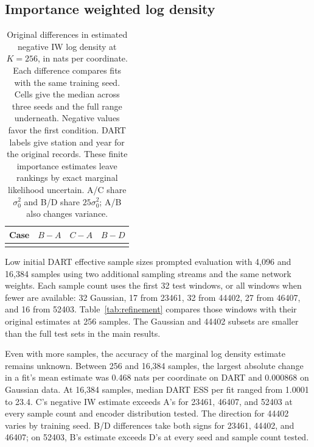 \documentclass{article}
\begin{document}
\subsection{Importance weighted log density}
\begin{table}[H]
\centering
\caption{Original differences in estimated negative IW log density at $K=256$, in nats per coordinate. Each difference compares fits with the same training seed. Cells give the median across three seeds and the full range underneath. Negative values favor the first condition. DART labels give station and year for the original records. These finite importance estimates leave rankings by exact marginal likelihood uncertain. A/C share $\sigma_0^2$ and B/D share $25\sigma_0^2$; A/B also changes variance.}
\label{tab:results}
\begin{tabular}{lccc}
\toprule
Case & $B{-}A$ & $C{-}A$ & $B{-}D$\\
\midrule
\\
\bottomrule
\end{tabular}
\end{table}

Low initial DART effective sample sizes prompted evaluation with 4,096 and 16,384 samples using two additional sampling streams and the same network weights. Each sample count uses the first 32 test windows, or all windows when fewer are available: 32 Gaussian, 17 from 23461, 32 from 44402, 27 from 46407, and 16 from 52403. Table~\ref{tab:refinement} compares those windows with their original estimates at 256 samples. The Gaussian and 44402 subsets are smaller than the full test sets in the main results.

Even with more samples, the accuracy of the marginal log density estimate remains unknown. Between 256 and 16,384 samples, the largest absolute change in a fit's mean estimate was 0.468 nats per coordinate on DART and 0.000868 on Gaussian data. At 16,384 samples, median DART ESS per fit ranged from 1.0001 to 23.4. C's negative IW estimate exceeds A's for 23461, 46407, and 52403 at every sample count and encoder distribution tested. The direction for 44402 varies by training seed. B/D differences take both signs for 23461, 44402, and 46407; on 52403, B's estimate exceeds D's at every seed and sample count tested.
\end{document}
